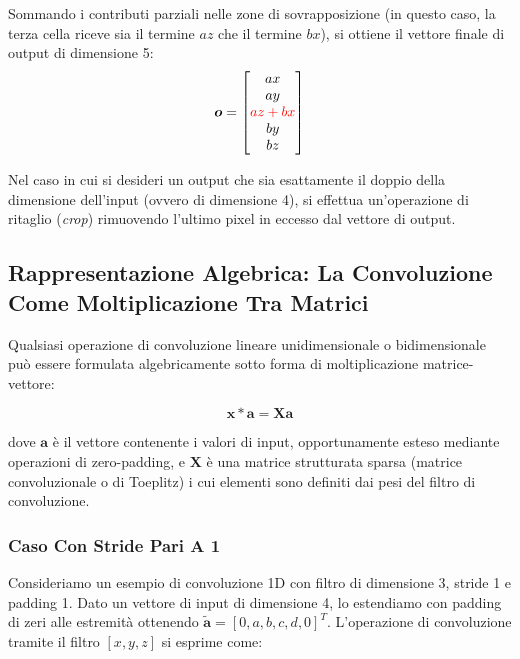 ﻿\documentclass[11pt, a4paper]{article}
\begin{document}
Sommando i contributi parziali nelle zone di sovrapposizione (in questo caso, la terza cella riceve sia il termine $az$ che il termine $bx$), si ottiene il vettore finale di output di dimensione 5:
\[
\bm{o} = \begin{bmatrix} ax \\ ay \\ \textcolor{red}{az + bx} \\ by \\ bz \end{bmatrix}
\]

Nel caso in cui si desideri un output che sia esattamente il doppio della dimensione dell'input (ovvero di dimensione 4), si effettua un'operazione di ritaglio (\emph{crop}) rimuovendo l'ultimo pixel in eccesso dal vettore di output.

\newpage

\subsection{Rappresentazione Algebrica: La Convoluzione Come Moltiplicazione Tra Matrici}

Qualsiasi operazione di convoluzione lineare unidimensionale o bidimensionale può essere formulata algebricamente sotto forma di moltiplicazione matrice-vettore:

\[
\bm{x} * \bm{a} = \bm{X}\bm{a}
\]

dove $\bm{a}$ è il vettore contenente i valori di input, opportunamente esteso mediante operazioni di zero-padding, e $\bm{X}$ è una matrice strutturata sparsa (matrice convoluzionale o di Toeplitz) i cui elementi sono definiti dai pesi del filtro di convoluzione.

\subsubsection{Caso Con Stride Pari A 1}

Consideriamo un esempio di convoluzione 1D con filtro di dimensione 3, stride 1 e padding 1. Dato un vettore di input di dimensione 4, lo estendiamo con padding di zeri alle estremità ottenendo $\tilde{\bm{a}} = [0, a, b, c, d, 0]^T$. L'operazione di convoluzione tramite il filtro $[x, y, z]$ si esprime come:

\end{document}
